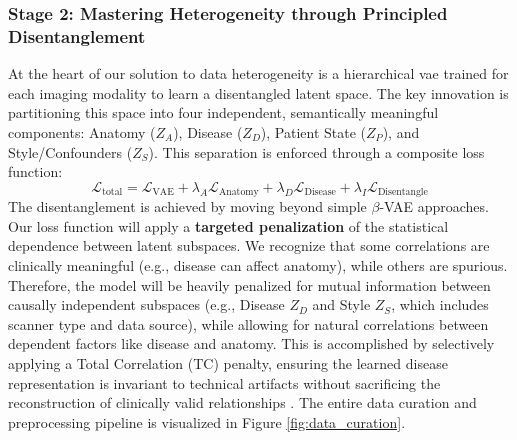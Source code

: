 \documentclass[11pt, a4paper]{article}
\begin{document}
\subsubsection{Stage 2: Mastering Heterogeneity through Principled Disentanglement}
At the heart of our solution to data heterogeneity is a hierarchical \gls{vae} trained for each imaging modality to learn a disentangled latent space. The key innovation is partitioning this space into four independent, semantically meaningful components: Anatomy ($Z_A$), Disease ($Z_D$), Patient State ($Z_P$), and Style/Confounders ($Z_S$). This separation is enforced through a composite loss function:
$$ \mathcal{L}_{\text{total}} = \mathcal{L}_{\text{VAE}} + \lambda_A \mathcal{L}_{\text{Anatomy}} + \lambda_D \mathcal{L}_{\text{Disease}} + \lambda_I \mathcal{L}_{\text{Disentangle}} $$
The disentanglement is achieved by moving beyond simple $\beta$-VAE approaches. Our loss function will apply a \textbf{targeted penalization} of the statistical dependence between latent subspaces. We recognize that some correlations are clinically meaningful (e.g., disease can affect anatomy), while others are spurious. Therefore, the model will be heavily penalized for mutual information between causally independent subspaces (e.g., Disease $Z_D$ and Style $Z_S$, which includes scanner type and data source), while allowing for natural correlations between dependent factors like disease and anatomy. This is accomplished by selectively applying a Total Correlation (TC) penalty, ensuring the learned disease representation is invariant to technical artifacts without sacrificing the reconstruction of clinically valid relationships \cite{FragemannArdizzone2022, AbbasiMonadjemi2018, FayCobos2023}. The entire data curation and preprocessing pipeline is visualized in Figure \ref{fig:data_curation}.
\end{document}
